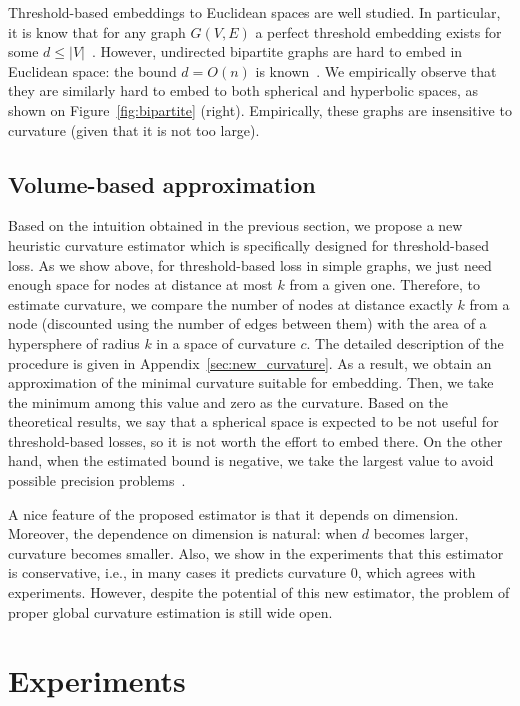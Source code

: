 \documentclass{article} %
\begin{document}
Threshold-based embeddings to Euclidean spaces are well studied. In particular, it is know that for any graph $G(V,E)$ a perfect threshold embedding  exists for some $d \le |V|$~\citep{maehara1984space}. 
However, undirected bipartite graphs are hard to embed in Euclidean space: the bound $d = O(n)$ is known~\citep{maehara1984space}. We empirically observe that they are similarly hard to embed to both spherical and hyperbolic spaces, as shown on Figure~\ref{fig:bipartite} (right). Empirically, these graphs are insensitive to curvature (given that it is not too large).
 
\subsection{Volume-based approximation}

Based on the intuition obtained in the previous section, we propose a new heuristic curvature estimator which is specifically designed for threshold-based loss. As we show above, for threshold-based loss in simple graphs, we just need enough space for nodes at distance at most $k$ from a given one. Therefore, to estimate curvature, we compare the number of nodes at distance exactly $k$ from a node (discounted using the number of edges between them) with the area of a hypersphere of radius $k$ in a space of curvature $c$. The detailed description of the procedure is given in Appendix~\ref{sec:new_curvature}. As a result, we obtain an approximation of the minimal curvature suitable for embedding.  Then, we take the minimum among this value and zero as the curvature. Based on the theoretical results, we say that a spherical space is expected to be not useful for threshold-based losses, so it is not worth the effort to embed there. On the other hand, when the estimated bound is negative, we take the largest value to avoid possible precision problems~\cite{sala2018representation}.

A nice feature of the proposed estimator is that it depends on dimension. Moreover, the dependence on dimension is natural: when $d$ becomes larger, curvature becomes smaller. Also, we show in the experiments that this estimator is conservative, i.e., in many cases it predicts curvature 0, which agrees with experiments. However, despite the potential of this new estimator, the problem of proper global curvature estimation is still wide open.
 
\section{Experiments}\label{sec:experiments}
\end{document}
